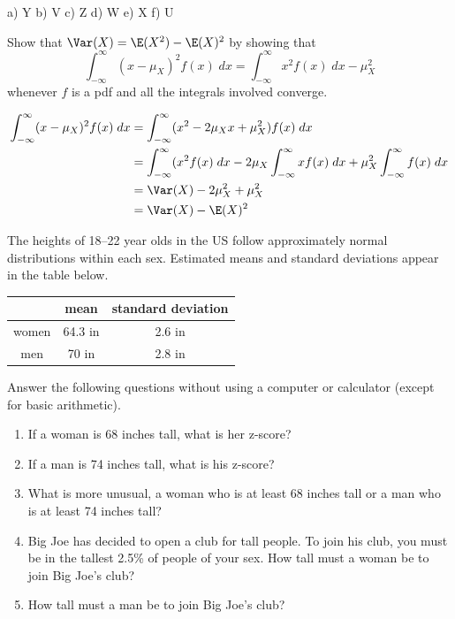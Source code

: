 \documentclass[twoside]{book}\usepackage[]{graphicx}\usepackage[]{xcolor}
\begin{document}
\begin{solution}
a) Y  b) V c) Z d) W  e) X f) U
\end{solution}

\begin{problem}
	Show that $\Var(X) = \E(X^2) - \E(X)^2$ by showing that 
	\[
	\int_{-\infty}^{\infty} (x - \mu_X) ^2 f(x) \; dx
	=
	\int_{-\infty}^{\infty} x^2 f(x) \; dx  -  \mu_X^2
	\]
	whenever $f$ is a pdf and all the integrals involved converge.
\end{problem}

\begin{solution}
	\begin{align*}
	\int_{-\infty}^{\infty} (x - \mu_X) ^2 f(x) \; dx
	&=
	\int_{-\infty}^{\infty} (x^2 - 2\mu_X x + \mu_X^2) f(x) \; dx
	\\
	&=
	\int_{-\infty}^{\infty} (x^2 f(x) \; dx
	- 2 \mu_X \int_{-\infty}^{\infty} x f(x) \; dx
	+ \mu_X^2 \int_{-\infty}^{\infty} f(x) \; dx
	\\
	&=
	\Var(X) - 2 \mu_X^2 + \mu_X^2
	\\
	&=
	\Var(X) - \E(X)^2 
\end{align*}
\end{solution}

\begin{problem}
	The heights of 18--22 year olds in the US follow approximately normal distributions
	within each sex.  Estimated means and standard deviations appear in the table below.
	\begin{center}
		\begin{tabular}{ccc}
			\hline
			& mean & standard deviation \\
			\hline
			women &64.3 in & 2.6 in  
			\\
			men & 70 in & 2.8 in
			\\
			\hline
		\end{tabular}
	\end{center}
	Answer the following questions without using a computer or calculator (except for basic
	arithmetic).
	\begin{enumerate}
		\item If a woman is 68 inches tall, what is her z-score?
		\item If a man is 74 inches tall, what is his z-score?
		\item What is more unusual, a woman who is at least 68 inches tall
			or a man who is at least 74 inches tall?
		\item
			Big Joe has decided to open a club for tall people.  To join his club,
			you must be in the tallest 2.5\% of people of your sex.
			How tall must a woman be to join Big Joe's club?
		\item
			How tall must a man be to join Big Joe's club?
	\end{enumerate}
\end{problem}
\end{document}
